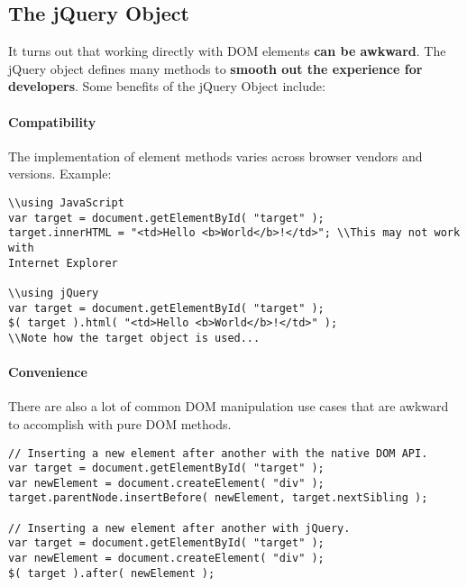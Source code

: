 \documentclass[10pt,letterpaper]{report}
\begin{document}
\subsection{The jQuery Object}
It turns out that working directly with DOM elements \textbf{can be awkward}. The jQuery object defines many methods to \textbf{smooth out the experience for developers}. Some benefits of the jQuery Object include:\\

\paragraph{Compatibility} The implementation of element methods varies across browser vendors and versions. Example:
\begin{lstlisting}
\\using JavaScript
var target = document.getElementById( "target" );
target.innerHTML = "<td>Hello <b>World</b>!</td>"; \\This may not work with 
Internet Explorer

\\using jQuery
var target = document.getElementById( "target" );
$( target ).html( "<td>Hello <b>World</b>!</td>" );
\\Note how the target object is used...
\end{lstlisting}
\paragraph{Convenience} There are also a lot of common DOM manipulation use cases that are awkward to accomplish with pure DOM methods.
\begin{lstlisting}
// Inserting a new element after another with the native DOM API.
var target = document.getElementById( "target" );
var newElement = document.createElement( "div" );
target.parentNode.insertBefore( newElement, target.nextSibling );

// Inserting a new element after another with jQuery.
var target = document.getElementById( "target" );
var newElement = document.createElement( "div" );
$( target ).after( newElement );
\end{lstlisting}
\end{document}
